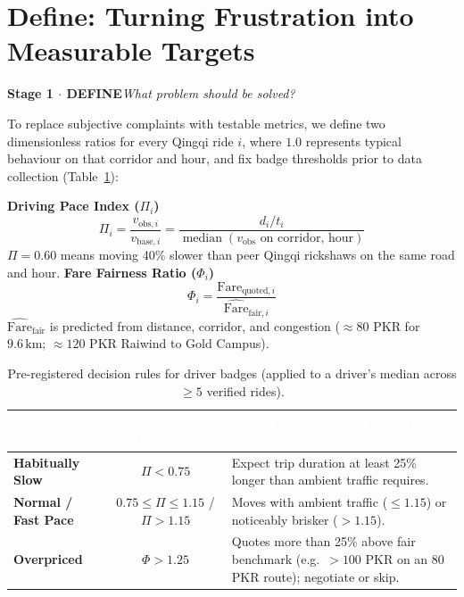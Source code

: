\documentclass[12pt, a4paper]{article}
\newcommand{\hdr}[1]{\textcolor{white}{\textbf{#1}}}
\newcommand{\stagebanner}[4]{%
  \begin{tcolorbox}[enhanced, colback=#4!7, colframe=#4, boxrule=0pt, leftrule=3.5pt,
    arc=2pt, left=6pt, right=6pt, top=1pt, bottom=1pt, before skip=1.5pt, after skip=2.5pt]
  {\fontsize{10pt}{11.5pt}\selectfont\color{#4}\bfseries Stage #1 \(\cdot\) #2}\hfill{\fontsize{10pt}{11.5pt}\selectfont\itshape\color{slate}#3}
  \end{tcolorbox}}
\begin{document}
\section{Define: Turning Frustration into Measurable Targets}
\stagebanner{1}{DEFINE}{What problem should be solved?}{navyblue}

To replace subjective complaints with testable metrics, we define two dimensionless ratios for every Qingqi ride \(i\), where \(1.0\) represents typical behaviour on that corridor and hour, and fix badge thresholds prior to data collection (Table~\ref{tab:define}):

\begin{tcolorbox}[enhanced, colback=white, colframe=navyblue, boxrule=0.7pt, arc=2pt, sidebyside, sidebyside align=top, lefthand width=0.52\textwidth, left=5pt, right=5pt, top=1.5pt, bottom=1.5pt, before skip=1.5pt, after skip=2pt]
{\color{navyblue}\bfseries\footnotesize Driving Pace Index (\(\Pi_i\))}
\[ \textstyle \Pi_i = \frac{v_{\mathrm{obs},i}}{v_{\mathrm{base},i}} = \frac{d_i / t_i}{\operatorname{median}(v_{\mathrm{obs}}\text{ on corridor, hour})} \]
{\scriptsize \(\Pi=0.60\) means moving 40\% slower than peer Qingqi rickshaws on the same road and hour.}
\tcblower
{\color{accentorange}\bfseries\footnotesize Fare Fairness Ratio (\(\Phi_i\))}
\[ \textstyle \Phi_i = \frac{\mathrm{Fare}_{\mathrm{quoted},i}}{\widehat{\mathrm{Fare}}_{\mathrm{fair},i}} \]
{\scriptsize \(\widehat{\mathrm{Fare}}_{\mathrm{fair}}\) is predicted from distance, corridor, and congestion (\(\approx 80\) PKR for \(9.6\,\mathrm{km}\); \(\approx 120\) PKR Raiwind to Gold Campus).}
\end{tcolorbox}

\begin{table}[H]
\centering\scriptsize
\caption{Pre-registered decision rules for driver badges (applied to a driver's median across \(\ge 5\) verified rides).}
\label{tab:define}
{\renewcommand{\arraystretch}{1.08}
\begin{tabularx}{\textwidth}{|>{\bfseries}l|c|X|}
\hline
\rowcolor{navyblue}\hdr{Badge} & \hdr{Rule (driver median)} & \hdr{Curbside guidance shown to the passenger} \\ \hline
\cellcolor{softred}\textcolor{accentred}{Habitually Slow} & \(\Pi < 0.75\) & Expect trip duration at least 25\% longer than ambient traffic requires. \\ \hline
\cellcolor{softgreen}\textcolor{accentgreen}{Normal / Fast Pace} & \(0.75 \le \Pi \le 1.15\) / \(\Pi > 1.15\) & Moves with ambient traffic (\(\le 1.15\)) or noticeably brisker (\(> 1.15\)). \\ \hline
\cellcolor{softorange}\textcolor{accentorange}{Overpriced} & \(\Phi > 1.25\) & Quotes more than 25\% above fair benchmark (e.g.\ \(>100\) PKR on an 80 PKR route); negotiate or skip. \\ \hline
\end{tabularx}}
\end{table}
\end{document}
